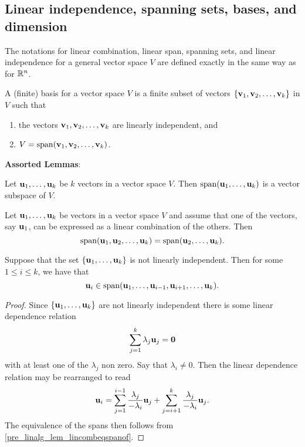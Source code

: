 \documentclass[10pt, a4paper]{article}
\begin{document}
\subsection{Linear independence, spanning sets, bases, and dimension}
The notations for linear combination, linear span, spanning sets, and linear independence for a general vector space $V$ are defined exactly in the same way as for $\mathbb{R} ^ n$.
\begin{definition}[Basis]
    A (finite) basis for a vector space $V$ is a finite subset of vectors $\{\mathbf{v}_1, \mathbf{v}_2, \dotsc, \mathbf{v}_k\}$ in $V$ such that
    \begin{enumerate}[label = (\roman*)]
        \item the vectors $\mathbf{v}_1, \mathbf{v}_2, \dotsc, \mathbf{v}_k$ are linearly independent,
        and
        \item $V = \mathrm{span}(\mathbf{v}_1, \mathbf{v}_2, \dotsc, \mathbf{v}_k)$.
    \end{enumerate}
\end{definition}

\textbf{Assorted Lemmas}:
\begin{lemma}
    Let $\mathbf{u}_1, \dotsc, \mathbf{u}_k$ be $k$ vectors in a vector space $V$.
    Then $\mathrm{span}(\mathbf{u}_1, \dotsc, \mathbf{u}_k)$ is a vector subspace of $V$.
\end{lemma}
\begin{lemma}\label{pre_linalg_lem_lincombeqspanof}
    Let $\mathbf{u}_1, \dotsc, \mathbf{u}_k$ be vectors in a vector space $V$ and assume that one of the vectors,
    say $\mathbf{u}_1$,
    can be expressed as a linear combination of the others.
    Then
    \[
    \mathrm{span}(\mathbf{u}_1, \mathbf{u}_2, \dotsc, \mathbf{u}_k) = \mathrm{span}(\mathbf{u}_2, \dotsc, \mathbf{u}_k).
    \]
\end{lemma}
\begin{lemma}
    Suppose that the set $\{\mathbf{u}_1, \dotsc, \mathbf{u}_k\}$ is not linearly independent.
    Then for some $1 \leq i \leq k$,
    we have that
    \[
    \mathbf{u}_i \in \mathrm{span}(\mathbf{u}_1, \dotsc, \mathbf{u}_{i - 1}, \mathbf{u}_{i + 1}, \dotsc, \mathbf{u}_k).
    \]
    \begin{proof}
        Since $\{\mathbf{u}_1, \dotsc, \mathbf{u}_k\}$ are not linearly independent there is some linear dependence relation
        \[
        \sum_{j = 1}^{k}\lambda_j\mathbf{u}_j = \mathbf{0}
        \]
        with at least one of the $\lambda_j$ non zero.
        Say that $\lambda_i \neq 0$.
        Then the linear dependence relation may be rearranged to read
        \[
        \mathbf{u}_i = \sum_{j = 1}^{i - 1}\frac{\lambda_j}{-\lambda_i}\mathbf{u}_j + \sum_{j = i + 1}^{k}\frac{\lambda_j}{-\lambda_i}\mathbf{u}_j.
        \]
        The equivalence of the spans then follows from \autoref{pre_linalg_lem_lincombeqspanof}.
    \end{proof}
\end{lemma}
\end{document}
